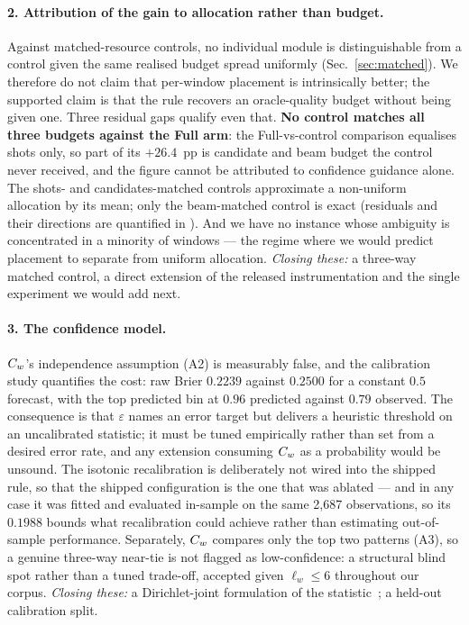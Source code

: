 \paragraph{2. Attribution of the gain to allocation rather than budget.}
Against matched-resource controls, no individual module is
distinguishable from a control given the same realised budget spread
uniformly (Sec.~\ref{sec:matched}). We therefore do not claim that
per-window placement is intrinsically better; the supported claim is that
the rule recovers an oracle-quality budget without being given one. Three
residual gaps qualify even that. \textbf{No control matches all three
budgets against the Full arm}: the Full-vs-control comparison equalises
shots only, so part of its $+26.4$~pp is candidate and beam budget the
control never received, and the figure cannot be attributed to confidence
guidance alone. The shots- and candidates-matched controls approximate a
non-uniform allocation by its mean; only the beam-matched control is
exact (residuals and their directions are quantified in \SItables{}). And
we have no instance whose ambiguity is concentrated in a minority of
windows --- the regime where we would predict placement to separate from
uniform allocation. \emph{Closing these:} a three-way matched control, a
direct extension of the released instrumentation and the single
experiment we would add next.

\paragraph{3. The confidence model.}
$C_w$'s independence assumption (A2) is measurably false, and the
calibration study quantifies the cost: raw Brier $0.2239$ against
$0.2500$ for a constant $0.5$ forecast, with the top predicted bin at
$0.96$ predicted against $0.79$ observed. The consequence is that
$\varepsilon$ names an error target but delivers a heuristic threshold on
an uncalibrated statistic; it must be tuned empirically rather than set
from a desired error rate, and any extension consuming $C_w$ as a
probability would be unsound. The isotonic recalibration is deliberately
not wired into the shipped rule, so that the shipped configuration is the
one that was ablated --- and in any case it was fitted and evaluated
in-sample on the same 2{,}687 observations, so its $0.1988$ bounds what
recalibration could achieve rather than estimating out-of-sample
performance. Separately, $C_w$ compares only the top two patterns (A3),
so a genuine three-way near-tie is not flagged as low-confidence: a
structural blind spot rather than a tuned trade-off, accepted given
$\ell_w\le6$ throughout our corpus. \emph{Closing these:} a
Dirichlet-joint formulation of the statistic~\cite{methodpaper}; a
held-out calibration split.

